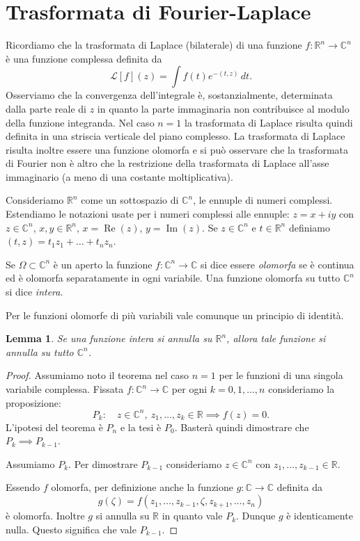 \documentclass[italian,a4paper,oneside,headinclude]{scrbook}
\renewcommand{\L}{\mathcal L}
\newcommand{\CC}{\mathbb C}
\newcommand{\RR}{\mathbb R}
\DeclareMathOperator{\Imaginarypart}{Im}
\renewcommand{\Im}{\Imaginarypart}
\DeclareMathOperator{\Realpart}{Re}
\renewcommand{\Re}{\Realpart}
\newtheorem{lemma}[theorem]{Lemma}
\begin{document}
\section{Trasformata di Fourier-Laplace}

Ricordiamo che la trasformata di Laplace (bilaterale) di una funzione
$f\colon \RR^n\to \CC^n$ è una funzione complessa definita da
\[
\L[f](z) = \int f(t) e^{-(t,z)}\, dt.
\]
Osserviamo che la convergenza dell'integrale è, sostanzialmente,
determinata dalla parte reale di $z$ in quanto la parte immaginaria
non contribuisce al modulo della funzione integranda.
Nel caso $n=1$ la trasformata di Laplace risulta quindi definita in
una striscia verticale del piano complesso.
La trasformata di Laplace risulta inoltre essere una funzione olomorfa
e si può osservare che la trasformata di Fourier non è altro che la
restrizione della trasformata di Laplace all'asse immaginario (a meno
di una costante moltiplicativa).

Consideriamo $\RR^n$ come un sottospazio di $\CC^n$, le ennuple di
numeri complessi. Estendiamo le notazioni usate per i numeri complessi
alle ennuple: $z = x + iy$ con $z\in \CC^n$, $x,y\in \RR^n$,
$x=\Re(z)$, $y=\Im(z)$. Se $z\in \CC^n$ e $t\in \RR^n$ definiamo
$(t,z) = t_1 z_1 + \dots + t_n z_n$.


Se $\Omega\subset \CC^n$ è un aperto la funzione
$f\colon \CC^n\to \CC$ si dice essere
\emph{olomorfa} 
se è continua ed è olomorfa
separatamente in ogni variabile. Una funzione olomorfa su tutto
$\CC^n$ si dice
\emph{intera}. 

Per le funzioni olomorfe di più variabili vale comunque un
principio di identità.
\begin{lemma}\label{lm:identita_intere}
Se una funzione intera si annulla su $\RR^n$, allora tale funzione si
annulla su tutto $\CC^n$.
\end{lemma}
%
\begin{proof}
  Assumiamo noto il teorema nel caso $n=1$ per le funzioni di una
  singola variabile complessa.
  Fissata $f\colon \CC^n\to \CC$ per ogni $k=0,1,\dots,n$
  consideriamo la proposizione:
  \[
  P_k:\quad z\in \CC^n,\ z_1,\dots,z_k \in \RR \implies f(z)=0.
  \]
  L'ipotesi del teorema è $P_n$ e la tesi è $P_0$. Basterà quindi
  dimostrare che $P_k \implies P_{k-1}$.

  Assumiamo $P_k$. Per dimostrare $P_{k-1}$ consideriamo $z\in \CC^n$
  con $z_1,\dots,z_{k-1}\in \RR$.

  Essendo $f$ olomorfa, per definizione
  anche la funzione $g\colon \CC\to \CC$
  definita da
  \[
  g(\zeta) = f(z_1, \dots, z_{k-1}, \zeta, z_{k+1}, \dots, z_n)
  \]
  è olomorfa. Inoltre $g$ si annulla su $\RR$ in quanto vale $P_k$.
  Dunque $g$ è identicamente nulla. Questo significa che vale
  $P_{k-1}$.
\end{proof}
\end{document}
